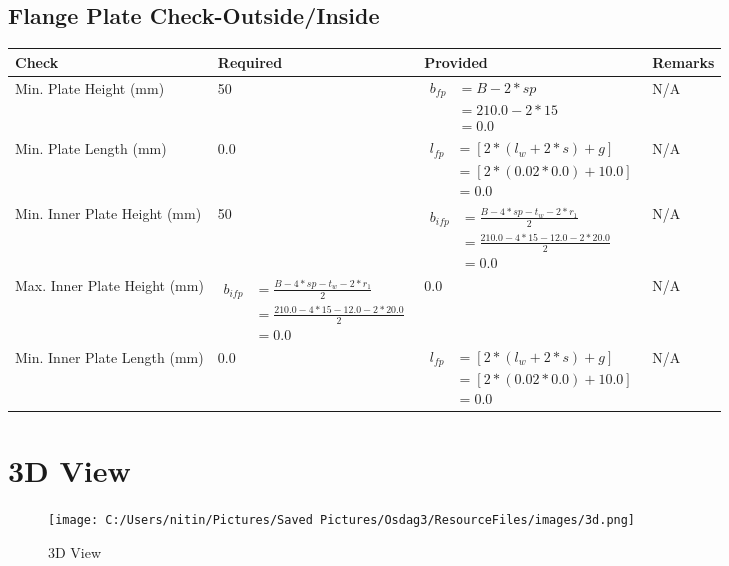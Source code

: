 \documentclass{article}%
\begin{document}
%
\newpage%
\subsection{Flange Plate Check{-}Outside/Inside}%
\label{subsec:FlangePlateCheck{-}Outside/Inside}%
\renewcommand{\arraystretch}{1.2}%
\begin{longtable}{|p{4cm}|p{6cm}|p{5.5cm}|p{1.5cm}|}%
\hline%
\rowcolor{OsdagGreen}%
Check&Required&Provided&Remarks\\%
\hline%
\endhead%
\hline%
Min. Plate Height (mm)&50&$\begin{aligned} b_{fp} &= {B - 2*sp} \\ &= {210.0 - 2 * 15} \\ &=0.0\end{aligned}$&N/A\\%
\hline%
Min. Plate Length (mm)&0.0&$\begin{aligned} l_{fp} & = [2*(l_{w} + 2*s) + g]\\ &= [2*(0.02*0.0) +10.0]\\ &=0.0\end{aligned}$&N/A\\%
\hline%
Min. Inner Plate Height (mm)&50&$\begin{aligned} b_{ifp} &= \frac{B - 4*sp - t_w - 2*r_1}{2} \\ &= \frac{210.0- 4*15-12.0- 2*20.0} {2} \\ &=0.0\end{aligned}$&N/A\\%
\hline%
Max. Inner Plate Height (mm)&$\begin{aligned} b_{ifp} &= \frac{B - 4*sp - t_w - 2*r_1}{2} \\ &= \frac{210.0- 4*15-12.0- 2*20.0} {2} \\ &=0.0\end{aligned}$&0.0&N/A\\%
\hline%
Min. Inner Plate Length (mm)&0.0&$\begin{aligned} l_{fp} & = [2*(l_{w} + 2*s) + g]\\ &= [2*(0.02*0.0) +10.0]\\ &=0.0\end{aligned}$&N/A\\%
\hline%
\end{longtable}

%
%
\newpage%
\section{3D View}%
\label{sec:3DView}%


\begin{figure}[h!]%
\centering%
\texttt{[image: C:/Users/nitin/Pictures/Saved Pictures/Osdag3/ResourceFiles/images/3d.png]}%
\caption{3D View}%
\end{figure}

%
\end{document}
